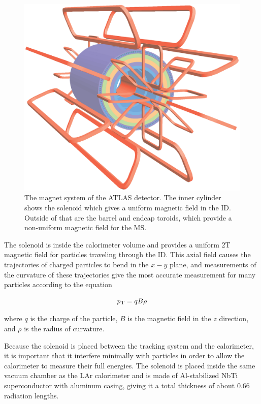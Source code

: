 \begin{centering}
\begin{figure}[bth]
\myfloatalign
\includegraphics[width=.90\linewidth]{figures/atlas/ATLcoilGeom.eps}
\caption{The magnet system of the \ac{ATLAS} detector. The inner cylinder shows the solenoid which gives a uniform magnetic field in the \ac{ID}. Outside of that are the barrel and endcap toroids, which provide a non-uniform magnetic field for the \ac{MS}.}
\label{fig:magnets}
\end{figure}
\end{centering}

The solenoid is inside the calorimeter volume and provides a uniform 2T magnetic field for particles traveling through the \ac{ID}. This axial field causes the trajectories of charged particles to bend in the $x-y$ plane, and measurements of the curvature of these trajectories give the most accurate \pt measurement for many particles according to the equation

\begin{equation}
p_{\text{T}} = qB\rho 
\end{equation}

where $q$ is the charge of the particle, $B$ is the magnetic field in the $z$ direction, and $\rho$ is the radius of curvature. 

Because the solenoid is placed between the tracking system and the calorimeter, it is important that it interfere minimally with particles in order to allow the calorimeter to measure their full energies. The solenoid is placed inside the same vacuum chamber as the LAr calorimeter and is made of Al-stabilized NbTi superconductor with aluminum casing, giving it a total thickness of about 0.66 radiation lengths. 

